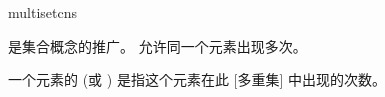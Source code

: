 \begin{modnl}[creators=Jinbo]{multiset}{cns}
	\begin{definition}[id=multiset.def]
		 是集合概念的推广。 允许同一个元素出现多次。
	\end{definition}

	\begin{definition}
		一个元素的  (或 ) 是指这个元素在此  中出现的次数。
	\end{definition}
\end{modnl}
